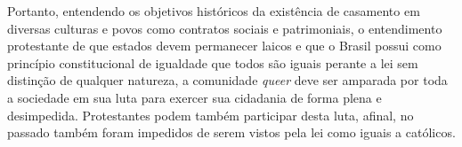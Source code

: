 \documentclass[
    article,            %
	12pt,				%
	oneside,			%
	a4paper,			%
	chapter=TITLE,		%
	section=TITLE,		%
	english,			%
	french,				%
	spanish,			%
	brazil				%
	]{abntex2}
\begin{document}
Portanto, entendendo os objetivos históricos da existência de casamento em diversas culturas e povos como contratos sociais e patrimoniais, o entendimento protestante de que estados devem permanecer laicos e que o Brasil possui como princípio constitucional de igualdade que todos são iguais perante a lei sem distinção de qualquer natureza, a comunidade \emph{queer} deve ser amparada por toda a sociedade em sua luta para exercer sua cidadania de forma plena e desimpedida. Protestantes podem também participar desta luta, afinal, no passado também foram impedidos de serem vistos pela lei como iguais a católicos.

% 
\end{document}
